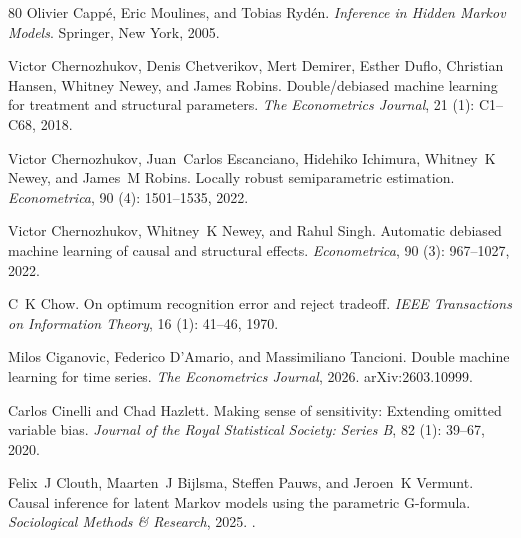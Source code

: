 \begin{thebibliography}{80}
Olivier Capp{\'e}, Eric Moulines, and Tobias Ryd{\'e}n.
\newblock \emph{Inference in Hidden Markov Models}.
\newblock Springer, New York, 2005.

Victor Chernozhukov, Denis Chetverikov, Mert Demirer, Esther Duflo, Christian Hansen, Whitney Newey, and James Robins.
\newblock Double/debiased machine learning for treatment and structural parameters.
\newblock \emph{The Econometrics Journal}, 21 (1): C1--C68, 2018.

Victor Chernozhukov, Juan~Carlos Escanciano, Hidehiko Ichimura, Whitney~K Newey, and James~M Robins.
\newblock Locally robust semiparametric estimation.
\newblock \emph{Econometrica}, 90 (4): 1501--1535, 2022{}.

Victor Chernozhukov, Whitney~K Newey, and Rahul Singh.
\newblock Automatic debiased machine learning of causal and structural effects.
\newblock \emph{Econometrica}, 90 (3): 967--1027, 2022{}.

C~K Chow.
\newblock On optimum recognition error and reject tradeoff.
\newblock \emph{IEEE Transactions on Information Theory}, 16 (1): 41--46, 1970.

Milos Ciganovic, Federico D'Amario, and Massimiliano Tancioni.
\newblock Double machine learning for time series.
\newblock \emph{The Econometrics Journal}, 2026.
\newblock arXiv:2603.10999.

Carlos Cinelli and Chad Hazlett.
\newblock Making sense of sensitivity: Extending omitted variable bias.
\newblock \emph{Journal of the Royal Statistical Society: Series B}, 82 (1): 39--67, 2020.

Felix~J Clouth, Maarten~J Bijlsma, Steffen Pauws, and Jeroen~K Vermunt.
\newblock Causal inference for latent {M}arkov models using the parametric {G}-formula.
\newblock \emph{Sociological Methods \& Research}, 2025.
\newblock {}.


\end{thebibliography}

